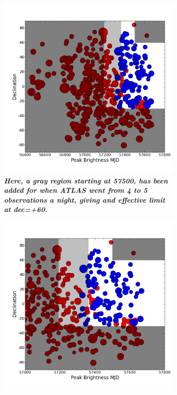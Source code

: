 \begin{figure}
	\centering
	\begin{subfigure}{.5\textwidth}
	  \centering
			\includegraphics[width=1\linewidth]{figures/variations/plot2useinPaper.png}
		\caption{\it \small{{\bf Here, a gray region starting at 57500, has been added for when ATLAS went from 4 to 5 observations a night, giving and effective limit at dec=+60\deg.}}}
		\label{fig:var5}
	\end{subfigure}%
	\begin{subfigure}{.5\textwidth}
	  \centering
			\includegraphics[width=1\linewidth]{figures/plot2useinPaper_restrictx.png}

\end{subfigure}
\end{figure}
